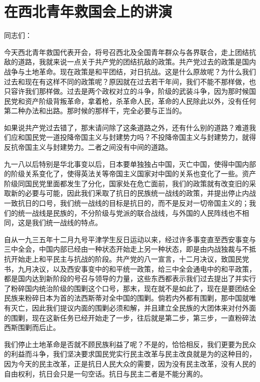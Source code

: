 \section[在西北青年救国会上的讲演（一九三七年）]{在西北青年救国会上的讲演}


同志们：

今天西北青年救国代表开会，将号召西北及全国青年群众与各界联合，走上团结抗敌的道路，我就来说一点关于共产党的团结抗敌的政策。共产党过去的政策是国内战争与土地革命。现在政策是和平团结，对日抗战。这是什么原故呢？为什么我们过去和现在有这样不同的政策呢？原因就在过去若干年间，我们不能不那样做，也只容许我们那样做。过去是两个政权对立的斗争，阶级的武装斗争，因为那时候国民党和资产阶级背叛革命，拿着枪，杀革命人民，革命的人民除此以外，没有任何第二种办法和出路。那时候的那样干，完全必要与正当的。

如果说共产党过去错了，那末请问除了这条道路之外，还有什么别的道路？难道我们应和国民党一道投降帝国主义与封建势力吗？不投降帝国主义与封建势力，就得反抗帝国主义与封建势力。二者之间没有中间的道路。

九一八以后特别是华北事变以后，日本要单独独占中国，灭亡中国，使得中国内部的阶级关系变化了，使得英法关等帝国主义国家对中国的关系也变化了一些。资产阶级同国民党里面都发生了分化，国家处在危亡面前，我们的政策就有改变旧的采取新的必要与可能，因此我们釆取了抗日的民族统一战线的政策，并提出停止内战一致抗日的口号，我们统一战线的目标是抗日的，而不是反对一切帝国主义的；我们的统一战线是民族的，不分阶级与党派的联合战线，与外国的人民阵线也不相同，这是我们统一战线的特点。

自从一九三五年十二月九号平津学生反日运动以来，经过许多事变直至西安事变与三中全会，中国内部已经由一种状态开始走上另一种状态，即是由内战独裁与不抵抗开始走上和平民主与抗战的阶段。共产党的八一宣言，十二月决议，致国民党书，九月决议，以及西安事变中的和平统一政策，给三中全会通电中的和平政策，都是国内达到新阶段的号召与领导的力量，这些东西都表示我们过去提出了并实行了粉碎国内统治阶级的围剿这个口号，那末，现在就不是如此了，现在是要团结全民族来粉碎日本为首的法西斯蒂对全中国的围剿。倘若内外都有围剿，那中国就唯有灭亡，因此我们提议内面的围剿必须和解，并且建立全民族的大团体来对付外面的围剿，现在这新任务已经开始走了一步，往后就是第二步，第三步，一直粉碎法西斯围剿而后止。

我们停止土地革命是否就不顾民族利益了呢？不是的，恰恰相反，我们更要为民众的利益而斗争，我们坚决要求国民党实行民主改革与民主改良就是为的这种目的，因为今天的民主改革，正是抗日人民大众的需要，因为没有民主改革，没有人民的自由权利，抗日会只是一句空话。抗日与民主二者是不能分离的。


